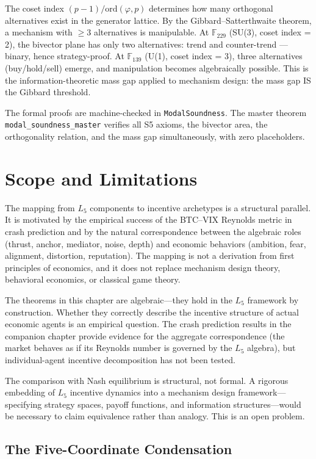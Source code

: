 The coset index $(p-1)/\mathrm{ord}(\varphi, p)$ determines how many orthogonal alternatives exist in the generator lattice. By the Gibbard--Satterthwaite theorem, a mechanism with $\geq 3$ alternatives is manipulable. At $\mathbb{F}_{229}$ (SU(3), coset index = 2), the bivector plane has only two alternatives: trend and counter-trend --- binary, hence strategy-proof. At $\mathbb{F}_{139}$ (U(1), coset index = 3), three alternatives (buy/hold/sell) emerge, and manipulation becomes algebraically possible. This is the information-theoretic mass gap applied to mechanism design: the mass gap IS the Gibbard threshold.

The formal proofs are machine-checked in \texttt{ModalSoundness}. The master theorem \texttt{modal\_soundness\_master} verifies all S5 axioms, the bivector area, the orthogonality relation, and the mass gap simultaneously, with zero placeholders.

\section{Scope and Limitations}

The mapping from $L_5$ components to incentive archetypes is a structural parallel. It is motivated by the empirical success of the BTC--VIX Reynolds metric in crash prediction and by the natural correspondence between the algebraic roles (thrust, anchor, mediator, noise, depth) and economic behaviors (ambition, fear, alignment, distortion, reputation). The mapping is not a derivation from first principles of economics, and it does not replace mechanism design theory, behavioral economics, or classical game theory.

The theorems in this chapter are algebraic---they hold in the $L_5$ framework by construction. Whether they correctly describe the incentive structure of actual economic agents is an empirical question. The crash prediction results in the companion chapter provide evidence for the aggregate correspondence (the market behaves as if its Reynolds number is governed by the $L_5$ algebra), but individual-agent incentive decomposition has not been tested.

The comparison with Nash equilibrium is structural, not formal. A rigorous embedding of $L_5$ incentive dynamics into a mechanism design framework---specifying strategy spaces, payoff functions, and information structures---would be necessary to claim equivalence rather than analogy. This is an open problem.

\subsection*{The Five-Coordinate Condensation}

